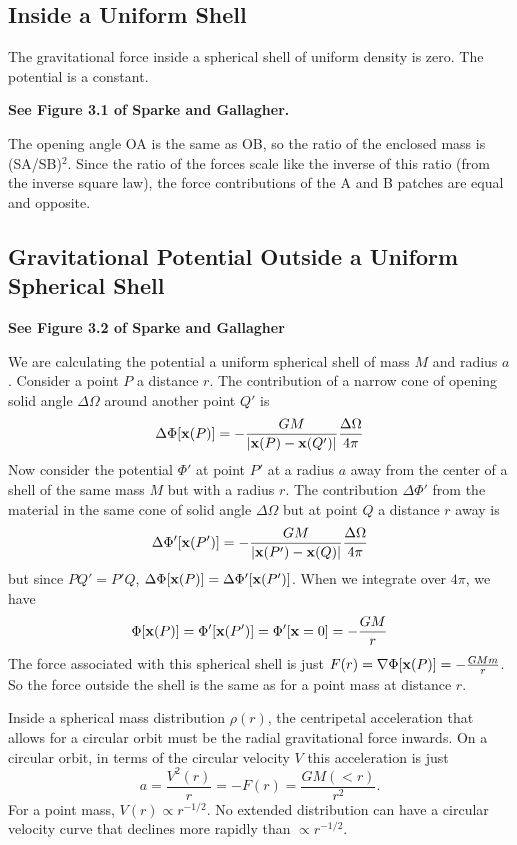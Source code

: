 \documentclass[]{article}
\begin{document}
\subsection{Inside a Uniform Shell}

The gravitational force inside a spherical shell of uniform density is zero.  The potential is a
constant.

{\bf See Figure 3.1 of Sparke and Gallagher.}

The opening angle OA is the same as OB, so the ratio of the enclosed mass is (SA/SB)$^{2}$.  Since
the ratio of the forces scale like the inverse of this ratio (from the inverse square law), the
force contributions of the A and B patches are equal and opposite.

\subsection{Gravitational Potential Outside a Uniform Spherical Shell}

{\bf See Figure 3.2 of Sparke and Gallagher}

We are calculating the potential a uniform spherical shell of mass $M$ and radius $a$.  
Consider a point $P$ a distance $r$. The contribution of a narrow cone of opening
solid angle $\Delta\Omega$ around another point $Q'$ is
\begin{equation}
\Delta\Phi[\mathbf{x}(P)] = -\frac{GM}{|\mathbf{x}(P) - \mathbf{x}(Q')|} \frac{\Delta\Omega}{4\pi}
\end{equation}
\noindent
Now consider the potential $\Phi'$ at point $P'$ at a radius $a$ away from the
center of a shell of the same mass $M$ but with a radius $r$.
The contribution $\Delta\Phi'$ from the material in the same cone of solid
angle $\Delta\Omega$ but at point $Q$ a distance $r$ away is
\begin{equation}
\Delta\Phi'[\mathbf{x}(P')] = - \frac{GM}{|\mathbf{x}(P') - \mathbf{x}(Q)|}\frac{\Delta\Omega}{4\pi}
\end{equation}
\noindent
but since $PQ'=P'Q$, $\Delta\Phi[\mathbf{x}(P)] = \Delta\Phi'[\mathbf{x}(P')]$.
When we integrate over $4\pi$, we have
\begin{equation}
\Phi[\mathbf{x}(P)] = \Phi'[\mathbf{x}(P')]= \Phi'[\mathbf{x}=0] = -\frac{GM}{r}
\end{equation}
\noindent
The force associated with this spherical shell is just $F(r) = \nabla \Phi[\mathbf{x}(P)] = -\frac{GMm}{r}$.
So the force outside the shell is the same as for a point mass at distance $r$.

Inside a spherical mass distribution $\rho(r)$, the 
centripetal acceleration that allows for a circular 
orbit must be the radial gravitational force inwards.
On a circular orbit, in terms of the circular velocity
$V$ this acceleration is just
\begin{equation}
a = \frac{V^{2}(r)}{r} = -F(r) = \frac{GM(<r)}{r^2}.
\end{equation}
\noindent
For a point mass, $V(r)\propto r^{-1/2}$.  No extended
distribution can have a circular velocity curve that
declines more rapidly than $\propto r^{-1/2}$.
\end{document}
